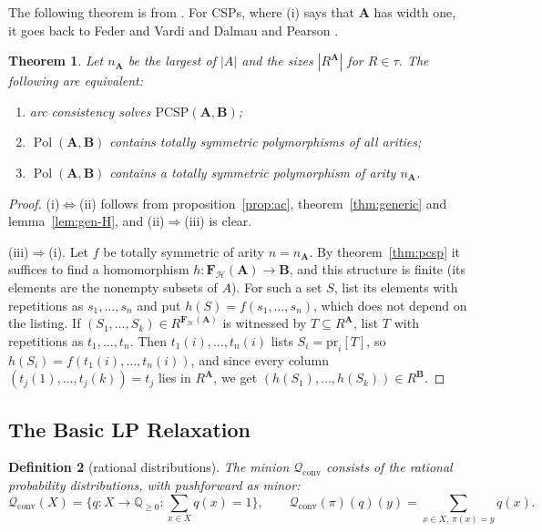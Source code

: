\documentclass[11pt]{article}
\theoremstyle{plain}
\newtheorem{theorem}{Theorem}[section]
\newtheorem{definition}[theorem]{Definition}
\theoremstyle{definition}
\newcommand{\Pol}{\operatorname{Pol}}
\newcommand{\pr}{\mathrm{pr}}
\newcommand{\bA}{\mathbf{A}}
\newcommand{\bB}{\mathbf{B}}
\newcommand{\bF}{\mathbf{F}}
\newcommand{\Hm}{\mathscr{H}}
\newcommand{\Q}{\mathbb{Q}}
\newcommand{\Qc}{\mathscr{Q}_{\mathrm{conv}}}
\newcommand{\PCSP}{\mathrm{PCSP}}
\begin{document}
The following theorem is from \cite{BBKO}. For CSPs, where (i) says that $\bA$ has width one, it goes back to Feder and Vardi \cite{FV} and Dalmau and Pearson \cite{DP}.

\begin{theorem}\label{thm:ac}
Let $n_{\bA}$ be the largest of $|A|$ and the sizes $|R^{\bA}|$ for $R\in\tau$. The following are equivalent:
\begin{enumerate}[label=(\roman*)]
  \item arc consistency solves $\PCSP(\bA,\bB)$;
  \item $\Pol(\bA,\bB)$ contains totally symmetric polymorphisms of all arities;
  \item $\Pol(\bA,\bB)$ contains a totally symmetric polymorphism of arity $n_{\bA}$.
\end{enumerate}
\end{theorem}

\begin{proof}
(i)$\Leftrightarrow$(ii) follows from proposition~\ref{prop:ac}, theorem~\ref{thm:generic} and lemma~\ref{lem:gen-H}, and (ii)$\Rightarrow$(iii) is clear.

(iii)$\Rightarrow$(i). Let $f$ be totally symmetric of arity $n=n_{\bA}$. By theorem~\ref{thm:pcsp} it suffices to find a homomorphism $h\colon\bF_\Hm(\bA)\to\bB$, and this structure is finite (its elements are the nonempty subsets of $A$). For such a set $S$, list its elements with repetitions as $s_1,\dots,s_n$ and put $h(S)=f(s_1,\dots,s_n)$, which does not depend on the listing. If $(S_1,\dots,S_k)\in R^{\bF_\Hm(\bA)}$ is witnessed by $T\subseteq R^{\bA}$, list $T$ with repetitions as $t_1,\dots,t_n$. Then $t_1(i),\dots,t_n(i)$ lists $S_i=\pr_i[T]$, so $h(S_i)=f(t_1(i),\dots,t_n(i))$, and since every column $(t_j(1),\dots,t_j(k))=t_j$ lies in $R^{\bA}$, we get $(h(S_1),\dots,h(S_k))\in R^{\bB}$.
\end{proof}

\subsection{The Basic LP Relaxation}\label{sec:blp}

\begin{definition}[rational distributions]
The minion $\Qc$ consists of the rational probability distributions, with pushforward as minor:
\[
\Qc(X)=\Big\{q\colon X\to\Q_{\geq0} : \sum_{x\in X}q(x)=1\Big\},\qquad\Qc(\pi)(q)(y)=\sum_{x\in X,\ \pi(x)=y}q(x).
\]
\end{definition}
\end{document}

